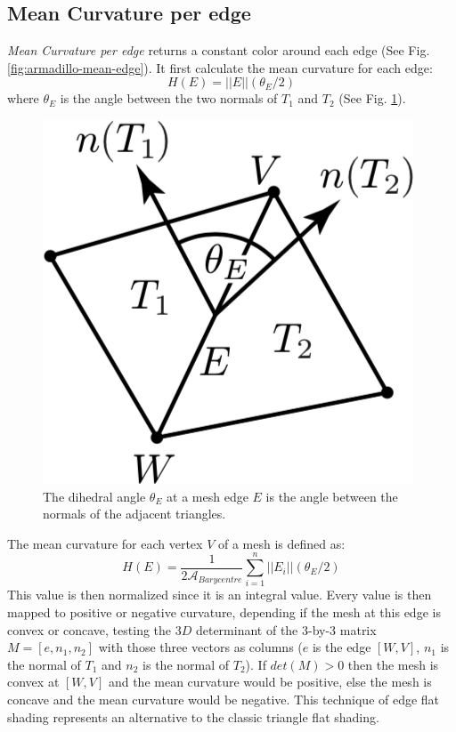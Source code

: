 \subsection{Mean Curvature per edge}
\textit{Mean Curvature per edge} returns a constant color around each edge (See Fig. \ref{fig:armadillo-mean-edge}). It first calculate the mean curvature for each edge:
$$H(E) = || E|| (\theta_E /2)$$
where $\theta_E$ is the angle between the two normals of $T_1$ and $T_2$ (See Fig. \ref{fig:mean-edge}).
\begin{figure}[H]
    \centering
    \includegraphics[scale=0.6]{images/mean-edge-theta.png}
    \caption{The dihedral angle $\theta_E$ at a mesh edge $E$ is the angle between the normals of the adjacent triangles. \cite{geometryprocessing}}\label{fig:mean-edge}
\end{figure}
The mean curvature for each vertex $V$ of a mesh is defined as:
$$H(E) = \frac{1}{2\mathcal{A}_{Barycentre}} \sum_{i = 1}^n ||E_i||(\theta_E/2)$$
This value is then normalized since it is an integral value. Every value is then mapped to positive or negative curvature, depending if the mesh at this edge is convex or concave, testing the $3D$ determinant of the 3-by-3 matrix $M = [e, n_1, n_2]$ with those three vectors as
columns ($e$ is the edge $[W, V]$, $n_1$ is the normal of $T_1$ and $n_2$ is the normal of $T_2$). If $det(M) > 0$ then the mesh is convex at $[W, V]$ and the mean curvature would be positive, else the mesh is concave and the mean curvature would be negative. This technique of edge flat shading represents an alternative to the classic triangle flat shading.

